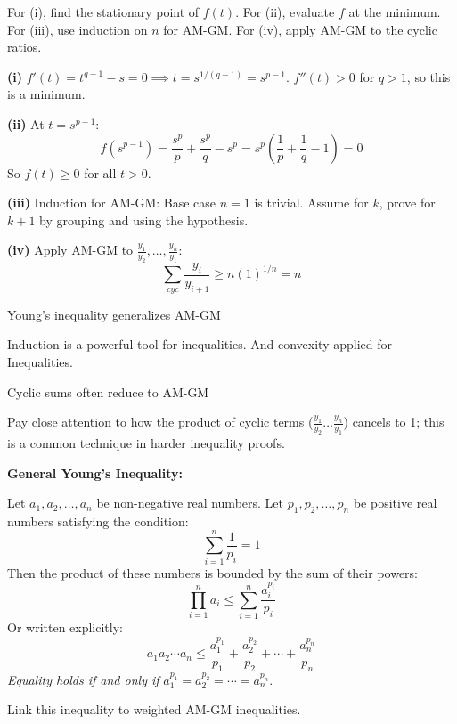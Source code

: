 \begin{hint}
For (i), find the stationary point of $f(t)$. For (ii), evaluate $f$ at the minimum. For (iii), use induction on $n$ for AM-GM. For (iv), apply AM-GM to the cyclic ratios.
\end{hint}

\begin{solution}
	\textbf{(i)} $f'(t) = t^{q-1} - s = 0 \implies t = s^{1/(q-1)} = s^{p-1}$. $f''(t) > 0$ for $q > 1$, so this is a minimum.

	\textbf{(ii)} At $t = s^{p-1}$:
    \[ f(s^{p-1}) = \frac{s^p}{p} + \frac{s^p}{q} - s^p = s^p\left(\frac{1}{p} + \frac{1}{q} - 1\right) = 0 \]
    So $f(t) \geq 0$ for all $t > 0$.

	\textbf{(iii)} Induction for AM-GM: Base case $n=1$ is trivial. Assume for $k$, prove for $k+1$ by grouping and using the hypothesis.

	\textbf{(iv)} Apply AM-GM to $\frac{y_1}{y_2}, \dots, \frac{y_n}{y_1}$:
    \[ \sum_{cyc} \frac{y_i}{y_{i+1}} \geq n \left(1\right)^{1/n} = n \]
\end{solution}

\begin{takeaways}
\item Young's inequality generalizes AM-GM
\item Induction is a powerful tool for inequalities. And convexity applied for Inequalities. 
\item Cyclic sums often reduce to AM-GM
\item Pay close attention to how the product of cyclic terms ($\frac{y_1}{y_2} \dots \frac{y_n}{y_1}$) cancels to 1; this is a common technique in harder inequality proofs.
\item \textbf{{General Young's Inequality}:} 

Let $a_1, a_2, \dots, a_n$ be non-negative real numbers. Let $p_1, p_2, \dots, p_n$ be positive real numbers satisfying the condition:
\[
\sum_{i=1}^{n} \frac{1}{p_i} = 1
\]
Then the product of these numbers is bounded by the sum of their powers:
\[
\prod_{i=1}^{n} a_i \le \sum_{i=1}^{n} \frac{a_i^{p_i}}{p_i}
\]
Or written explicitly:
\[
a_1 a_2 \cdots a_n \le \frac{a_1^{p_1}}{p_1} + \frac{a_2^{p_2}}{p_2} + \cdots + \frac{a_n^{p_n}}{p_n}
\]
\textit{Equality holds if and only if } $a_1^{p_1} = a_2^{p_2} = \cdots = a_n^{p_n}$.

Link this inequality to weighted AM-GM inequalities.
\end{takeaways}
